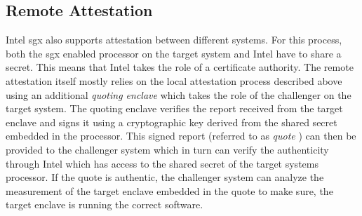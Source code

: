 \subsection{Remote Attestation}
Intel \ac{sgx} also supports attestation between different systems. For this process, both the \ac{sgx} enabled processor on the target system and Intel have to share a secret. This
means that Intel takes the role of a certificate authority. The remote attestation itself mostly relies on the local attestation process described above using an additional 
\textit{quoting enclave} which takes the role of the challenger on the target system. The quoting enclave verifies the report received from the target enclave and signs it using 
a cryptographic key derived from the shared secret embedded in the processor. This signed report (referred to as \textit{quote} \cite{EnclaveWritersGuide}) can then be provided 
to the challenger system which in turn can verify the authenticity through Intel which has access to the shared secret of the target systems processor. If the quote is authentic, 
the challenger system can analyze the measurement of the target enclave embedded in the quote to make sure, the target enclave is running the correct software.
